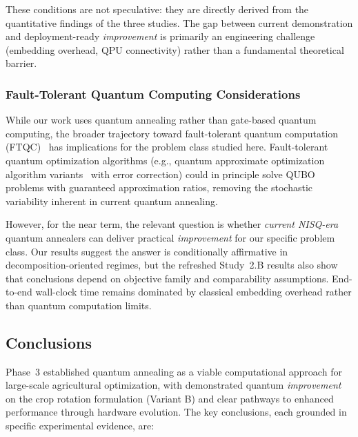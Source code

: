 \documentclass{oqireport}
\begin{document}
These conditions are not speculative: they are directly derived from the quantitative findings of the three studies. The gap between current demonstration and deployment-ready \textit{improvement} is primarily an engineering challenge (embedding overhead, QPU connectivity) rather than a fundamental theoretical barrier.

\subsubsection{Fault-Tolerant Quantum Computing Considerations}

While our work uses quantum annealing rather than gate-based quantum computing, the broader trajectory toward fault-tolerant quantum computation (FTQC)~\cite{campbell2017roads} has implications for the problem class studied here. Fault-tolerant quantum optimization algorithms (e.g., quantum approximate optimization algorithm variants~\cite{edwardfarhiQuantumApproximateOptimization2014} with error correction) could in principle solve QUBO problems with guaranteed approximation ratios, removing the stochastic variability inherent in current quantum annealing.

However, for the near term, the relevant question is whether \textit{current NISQ-era} quantum annealers can deliver practical \textit{improvement} for our specific problem class. Our results suggest the answer is conditionally affirmative in decomposition-oriented regimes, but the refreshed Study~2.B results also show that conclusions depend on objective family and comparability assumptions. End-to-end wall-clock time remains dominated by classical embedding overhead rather than quantum computation limits.

\subsection{Conclusions}

Phase~3 established quantum annealing as a viable computational approach for large-scale agricultural optimization, with demonstrated quantum \textit{improvement} on the crop rotation formulation (Variant B) and clear pathways to enhanced performance through hardware evolution. The key conclusions, each grounded in specific experimental evidence, are:
\end{document}

